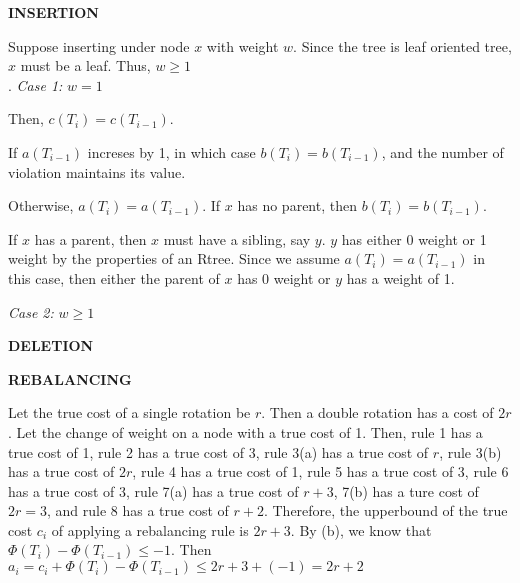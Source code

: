 \documentclass[10pt]{article}
\begin{document}
\begin{enumerate}
\begin{enumerate}
				\textbf{INSERTION}
				\begin{addmargin}
					Suppose inserting under node $x$ with weight $w$. 
					Since the tree is leaf oriented tree, $x$ must be a leaf.
					Thus, $w \geq 1$ \\.
					\textit{Case 1:} $w = 1$
					\begin{addmargin}[1em]{0em}
						Then, $c(T_i) = c(T_{i-1})$.

						If $a(T_{i-1})$ increses by 1, in which case $b(T_i) = b(T_{i-1})$, and the number of violation maintains its value.

						Otherwise, $a(T_i) = a(T_{i-1})$.
						If $x$ has no parent, then $b(T_i) = b (T_{i-1})$.

						If $x$ has a parent, then $x$ must have a sibling, say $y$.
						$y$ has either 0 weight or 1 weight by the properties of an Rtree.
						Since we assume $a(T_i) = a(T_{i-1})$ in this case, then either the parent of $x$ has 0 weight or $y$ has a weight of 1.
					\end{addmargin}
					\textit{Case 2:} $w \geq 1$
					\begin{addmargin}[1em]{0em}
					\end{addmargin}
				\end{addmargin}
				
				\textbf{DELETION}

				\textbf{REBALANCING}
				\begin{addmargin}
				Let the true cost of a single rotation be $r$.
				Then a double rotation has a cost of $2r$.
				Let the change of weight on a node with a true cost of 1.
				Then, rule 1 has a true cost of 1, rule 2 has a true cost of 3, rule 3(a) has a true cost of $r$, rule 3(b) has a true cost of $2r$, 
				rule 4 has a true cost of 1, rule 5 has a true cost of 3, rule 6 has a true cost of 3, rule 7(a) has a true cost of $r+3$, 7(b) has a ture cost of $2r=3$,
				and rule 8 has a true cost of $r+2$.
				Therefore, the upperbound of the true cost $c_i$ of applying a rebalancing rule  is $2r+3$.
				By (b), we know that $\Phi(T_i) - \Phi(T_{i-1}) \leq -1$.
				Then $a_i = c_i + \Phi(T_i) - \Phi(T_{i-1}) \leq 2r+3 + (-1) = 2r+2$
				\end{addmargin}
		\end{enumerate}
\end{enumerate}
\end{document}

